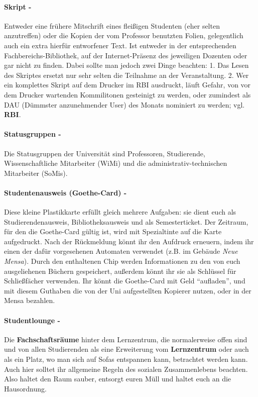 \paragraph{Skript -} Entweder eine frühere Mitschrift eines fleißigen Studenten (eher selten anzutreffen) oder die Kopien der vom Professor benutzten Folien, gelegentlich auch ein extra hierfür entworfener Text. Ist entweder in der entsprechenden Fachbereichs-Bibliothek, auf der Internet-Präsenz des jeweiligen Dozenten oder gar nicht zu finden. Dabei sollte man jedoch zwei Dinge beachten: 1. Das Lesen des Skriptes ersetzt nur sehr selten die Teilnahme an der Veranstaltung. 2. Wer ein komplettes Skript auf dem Drucker im RBI ausdruckt, läuft Gefahr, von vor dem Drucker wartenden Kommilitonen gesteinigt zu werden, oder zumindest als DAU (Dümmster anzunehmender User) des Monats nominiert zu werden; vgl. \textbf{RBI}.
\paragraph{Statusgruppen -} Die Statusgruppen der Universität sind Professoren, Studierende, Wissenschaftliche Mitarbeiter (WiMi) und die administrativ-technischen Mitarbeiter (SoMis).
\paragraph{Studentenausweis (Goethe-Card) -} Diese kleine Plastikkarte erfüllt gleich mehrere Aufgaben: sie dient euch als Studierendenausweis, Bibliotheksausweis und als Semesterticket. Der Zeitraum, für den die Goethe-Card gültig ist, wird mit Spezialtinte auf die Karte aufgedruckt. Nach der Rückmeldung könnt ihr den Aufdruck erneuern, indem ihr einen der dafür vorgesehenen Automaten verwendet (z.B. im Gebäude \textit{Neue Mensa}). Durch den enthaltenen Chip werden Informationen zu den von euch ausgeliehenen Büchern gespeichert, außerdem könnt ihr sie als Schlüssel für Schließfächer verwenden. Ihr könnt die Goethe-Card mit Geld ``aufladen'', und mit diesem Guthaben die von der Uni aufgestellten Kopierer nutzen, oder in der Mensa bezahlen.
\paragraph{Studentlounge -} Die \textbf{Fachschaftsräume} hinter dem Lernzentrum, die normalerweise offen sind und von allen Studierenden als eine Erweiterung vom \textbf{Lernzentrum} oder auch als ein Platz, wo man sich auf Sofas entspannen kann, betrachtet werden kann. Auch hier solltet ihr allgemeine Regeln des sozialen Zusammenlebens beachten. Also haltet den Raum sauber, entsorgt euren Müll und haltet euch an die Hausordnung.
